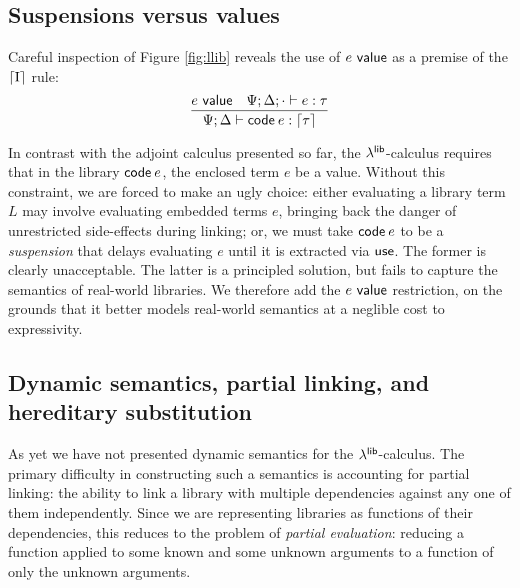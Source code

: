 \documentclass[11pt]{article}
\begin{document}

\subsection{Suspensions versus values}

Careful inspection of Figure \ref{fig:llib} reveals the use of $e ~\textsf{value}$ as a
premise of the $\lceil{\text{I}}\rceil$ rule:
\[
\infer{\Psi;\D \ent \code{e} \isa \up{\tau}}{
  e \isval &
  \Psi;\D;\ecx \ent e \isa \tau}
\]

In contrast with the adjoint calculus presented so far, the $\lambda^{\textsf{lib}}$-calculus
requires that in the library $\textsf{code}\:{e}$, the enclosed term $e$ be a value.
Without this constraint, we are forced to make an ugly choice: either evaluating
a library term $L$ may involve evaluating embedded terms $e$, bringing back the
danger of unrestricted side-effects during linking; or, we must take $\textsf{code}\:{e}$
to be a \emph{suspension} that delays evaluating $e$ until it is extracted via
$\textsf{use}$. The former is clearly unacceptable. The latter is a principled
solution, but fails to capture the semantics of real-world libraries. We
therefore add the $e ~\textsf{value}$ restriction, on the grounds that it better models
real-world semantics at a neglible cost to expressivity.



\subsection{Dynamic semantics, partial linking, and hereditary substitution}

As yet we have not presented dynamic semantics for the $\lambda^{\textsf{lib}}$-calculus. The
primary difficulty in constructing such a semantics is accounting for partial
linking: the ability to link a library with multiple dependencies against any
one of them independently. Since we are representing libraries as functions of
their dependencies, this reduces to the problem of \emph{partial evaluation}:
reducing a function applied to some known and some unknown arguments to a
function of only the unknown arguments.


\end{document}

